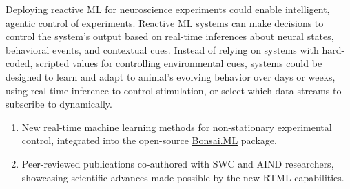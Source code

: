 Deploying reactive ML for neuroscience experiments could enable intelligent, agentic control of experiments. Reactive ML systems can make decisions to control the system's output based on real-time inferences about neural states, behavioral events, and contextual cues. Instead of relying on systems with hard-coded, scripted values for controlling environmental cues, systems could be designed to learn and adapt to animal’s evolving behavior over days or weeks, using real-time inference to control stimulation, or select which data streams to subscribe to dynamically.


\begin{enumerate}
    \item New real-time machine learning methods for non-stationary experimental control, integrated into the open-source \href{https://bonsai-rx.org/machinelearning/}{Bonsai.ML} package.
    \item Peer-reviewed publications co-authored with SWC and AIND researchers, showcasing scientific advances made possible by the new RTML capabilities.
\end{enumerate}

